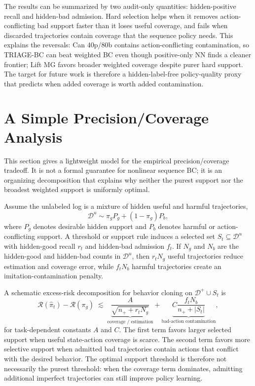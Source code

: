 \documentclass[11pt]{article}
\newcommand{\Dpos}{\mathcal{D}^{+}}
\newcommand{\Dunl}{\mathcal{D}^{u}}
\newcommand{\method}{TRIAGE-BC}
\begin{document}
The results can be summarized by two audit-only quantities: hidden-positive recall and hidden-bad admission. Hard selection helps when it removes action-conflicting bad support faster than it loses useful coverage, and fails when discarded trajectories contain coverage that the sequence policy needs. This explains the reversals: Can 40p/80b contains action-conflicting contamination, so \method{} can beat weighted BC even though positive-only NN finds a cleaner frontier; Lift MG favors broader weighted coverage despite purer hard support. The target for future work is therefore a hidden-label-free policy-quality proxy that predicts when added coverage is worth added contamination.

\section{A Simple Precision/Coverage Analysis}

This section gives a lightweight model for the empirical precision/coverage tradeoff. It is not a formal guarantee for nonlinear sequence BC; it is an organizing decomposition that explains why neither the purest support nor the broadest weighted support is uniformly optimal.

Assume the unlabeled log is a mixture of hidden useful and harmful trajectories,
\begin{equation}
  \Dunl \sim \pi_g P_g + (1-\pi_g)P_b,
\end{equation}
where $P_g$ denotes desirable hidden support and $P_b$ denotes harmful or action-conflicting support. A threshold or support rule induces a selected set $S_t \subseteq \Dunl$ with hidden-good recall $r_t$ and hidden-bad admission $f_t$. If $N_g$ and $N_b$ are the hidden-good and hidden-bad counts in $\Dunl$, then $r_tN_g$ useful trajectories reduce estimation and coverage error, while $f_tN_b$ harmful trajectories create an imitation-contamination penalty.

A schematic excess-risk decomposition for behavior cloning on $\Dpos\cup S_t$ is
\begin{equation}
  \mathcal{R}(\hat{\pi}_t) - \mathcal{R}(\pi_g)
  \;\lesssim\;
  \underbrace{\frac{A}{\sqrt{n_+ + r_tN_g}}}_{\text{coverage / estimation}}
  +
  \underbrace{
  C\frac{f_tN_b}{n_+ + |S_t|}
  }_{\text{bad-action contamination}},
  \label{eq:hard-risk-view}
\end{equation}
for task-dependent constants $A$ and $C$. The first term favors larger selected support when useful state-action coverage is scarce. The second term favors more selective support when admitted bad trajectories contain actions that conflict with the desired behavior. The optimal support threshold is therefore not necessarily the purest threshold: when the coverage term dominates, admitting additional imperfect trajectories can still improve policy learning.
\end{document}
